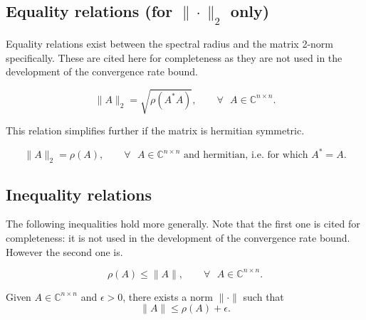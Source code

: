 \documentclass{article}
\begin{document}
\subsection*{Equality relations (for $\| \cdot \|_2$ only)}
Equality relations exist between the spectral radius and the matrix 2-norm specifically. These are cited here for completeness as they are not used in the development of the convergence rate bound.
\begin{thm}
\label{th_eq_sprad_m2nrm}
\[
	\|A\|_2 = \sqrt{\rho(A^*A)}, \qquad \forall \text{ } A \in \mathds{C}^{n\times n}. 
\]
\end{thm}
\par This relation simplifies further if the matrix is hermitian symmetric.
\begin{thm}
\[
	\|A\|_2 = \rho(A), \qquad \forall \text{ } A \in \mathds{C}^{n\times n} \text{ and  hermitian, i.e. for which } A^*=A.
\]
\end{thm}

\subsection*{Inequality relations}
\par The following inequalities hold more generally. Note that the first one is cited for completeness: it is not used in the development of the convergence rate bound. However the second one is.
\begin{thm}
\[
	\rho(A) \le \|A\|, \qquad \forall \text{ } A \in \mathds{C}^{n\times n}.
\]
\end{thm}

\begin{thm} Given $A\in \mathds{C}^{n\times n}$ and $\epsilon>0$, there exists a norm $\|\cdot \|$ such that
\label{th_mnrm_ubound}
\[
	\|A\| \le \rho(A) + \epsilon.
\]
\end{thm}

\pagebreak


\end{document}
